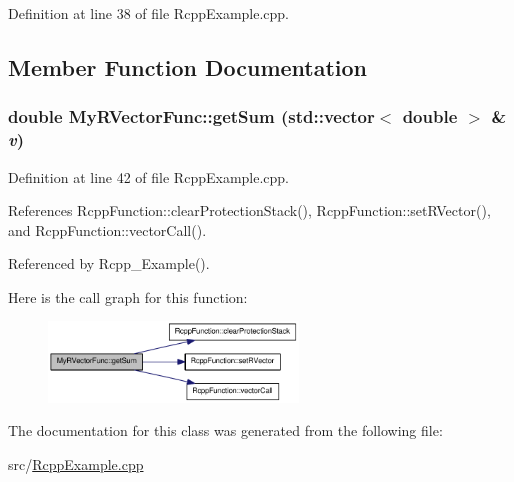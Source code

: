 Definition at line 38 of file RcppExample.cpp.

\subsection{Member Function Documentation}
\hypertarget{classMyRVectorFunc_a2eba5a390ca620a687e77208bfbb6df4}{
\subsubsection[{getSum}]{\setlength{\rightskip}{0pt plus 5cm}double MyRVectorFunc::getSum (std::vector$<$ double $>$ \& {\em v})}}
\label{classMyRVectorFunc_a2eba5a390ca620a687e77208bfbb6df4}


Definition at line 42 of file RcppExample.cpp.

References RcppFunction::clearProtectionStack(), RcppFunction::setRVector(), and RcppFunction::vectorCall().

Referenced by Rcpp\_\-Example().

Here is the call graph for this function:\nopagebreak
\begin{figure}[H]
\begin{center}
\leavevmode
\includegraphics[width=188pt]{classMyRVectorFunc_a2eba5a390ca620a687e77208bfbb6df4_cgraph}
\end{center}
\end{figure}


The documentation for this class was generated from the following file:\begin{DoxyCompactItemize}
\item 
src/\hyperlink{RcppExample_8cpp}{RcppExample.cpp}\end{DoxyCompactItemize}
